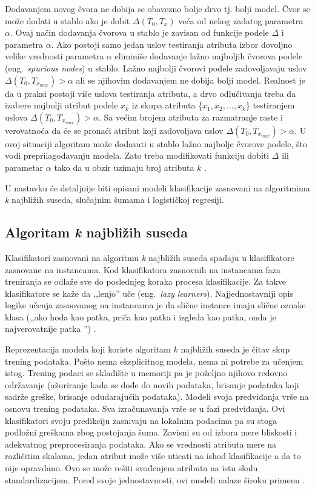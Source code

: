 \documentclass[12pt,oneside]{memoir}
\begin{document}
\begin{description}
Dodavanjem novog čvora ne dobija se obavezno bolje drvo tj. bolji model. Čvor se može dodati u stablo ako je dobit $\Delta(T_0, T_x)$ veća od nekog zadatog parametra $\alpha$. Ovaj način dodavanja čvorova u stablo je zavisan od funkcije podele $\Delta$ i parametra $\alpha$. Ako postoji samo jedan uslov testiranja atributa izbor dovoljno velike vrednosti parametra $\alpha$ eliminiše dodavanje lažno najboljih čvorova podele (eng.~\textit{spurious nodes}) u stablo. Lažno najbolji čvorovi podele zadovoljavaju uslov $\Delta(T_0, T_{x_{max}})>\alpha$ ali se njihovim dodavanjem ne dobija bolji model. Realnost je da u praksi postoji više uslova testiranja atributa, a drvo odlučivanja treba da izabere najbolji atribut podele $x_k$ iz skupa atributa \{$x_1, x_2,...,x_k$\} testiranjem uslova $\Delta(T_0, T_{x_{max}})>\alpha$. Sa većim brojem atributa za razmatranje raste i verovatnoća da će se pronaći atribut koji zadovoljava uslov $\Delta(T_0, T_{x_{max}})>\alpha$. U ovoj situaciji algoritam može dodavati u stablo lažno najbolje čvorove podele, što vodi preprilagođavanju modela. Zato treba modifikovati funkciju dobiti $\Delta$ ili parametar $\alpha$ tako da u obzir uzimaju broj atributa $k$ \cite{mitic}.
\end{description}

U nastavku će detaljnije biti opisani modeli klasifikacije zasnovani na algoritmima \textit{k} najbližih suseda, 
slučajnim šumama i logističkoj regresiji.

\subsection{Algoritam \textit{k} najbližih suseda}

Klasifikatori zasnovani na algoritmu \textit{k} najbližih suseda spadaju u klasifikatore zasnovane na instancama. Kod klasifikatora zasnovnih na instancama faza treniranja se odlaže sve do poslednjeg koraka procesa klasifikacije. Za takve klasifikatore se kaže da ,,lenjo'' uče (eng.~\textit{lazy learners}). Najjednostavniji opis logike učenja zasnovanog na instancama je da slične instance imaju slične oznake klasa (,,ako hoda kao patka, priča kao patka i izgleda kao patka, onda je najverovatnije patka \cite{mitic}'') \cite{aggarwal}.

Reprezentacija modela koji koriste algoritam $k$ najbližih suseda je čitav skup trening podataka. Pošto nema eksplicitnog modela, nema ni potrebe za učenjem istog. Trening podaci se skladište u memoriji pa je poželjno njihovo redovno održavanje (ažuriranje kada se dođe do novih podataka, brisanje podataka koji sadrže greške, brisanje odudarajućih podataka). Modeli svoja predviđanja vrše na osnovu trening podataka. Sva izračunavanja vrše se u fazi predviđanja. Ovi klasifikatori svoju predikciju zasnivaju na lokalnim podacima pa su stoga podložni greškama zbog postojanja šuma. Zavisni su od izbora mere bliskosti i adekvatnog preprocesiranja podataka. Ako se vrednosti atributa mere na različitim skalama, jedan atribut može više uticati na ishod klasifikacije a da to nije opravdano. Ovo se može rešiti svođenjem atributa na istu skalu standardizacijom. Pored svoje jednostavnosti, ovi modeli nalaze široku primenu \cite{mlm, mladen, mitic}.
\end{document}
